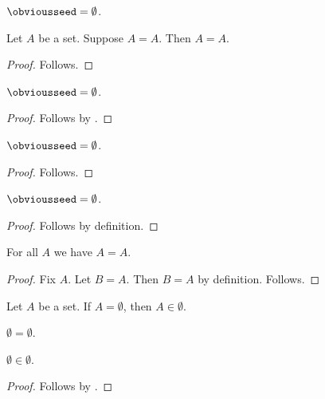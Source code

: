 \begin{definition}\label{obvious_seed}
    $\obviousseed = \emptyset$.
\end{definition}

\begin{proposition}\label{obvious_local}
    Let $A$ be a set.
    Suppose $A=A$.
    Then $A=A$.
\end{proposition}
\begin{proof}
    Follows.
\end{proof}

\begin{proposition}\label{obvious_cited}
    $\obviousseed = \emptyset$.
\end{proposition}
\begin{proof}
    Follows by .
\end{proof}

\begin{proposition}\label{obvious_definition_root}
    $\obviousseed = \emptyset$.
\end{proposition}
\begin{proof}
    Follows.
\end{proof}

\begin{proposition}\label{obvious_by_definition}
    $\obviousseed = \emptyset$.
\end{proposition}
\begin{proof}
    Follows by definition.
\end{proof}

\begin{proposition}\label{obvious_local_definition}
    For all $A$ we have $A=A$.
\end{proposition}
\begin{proof}
    Fix $A$.
    Let $B=A$.
    Then $B=A$ by definition.
    Follows.
\end{proof}

\begin{axiom}\label{obvious_rule}
    Let $A$ be a set.
    If $A = \emptyset$, then $A \in \emptyset$.
\end{axiom}

\begin{axiom}\label{obvious_irrelevant}
    $\emptyset = \emptyset$.
\end{axiom}

\begin{proposition}\label{obvious_application}
    $\emptyset \in \emptyset$.
\end{proposition}
\begin{proof}
    Follows by .
\end{proof}

